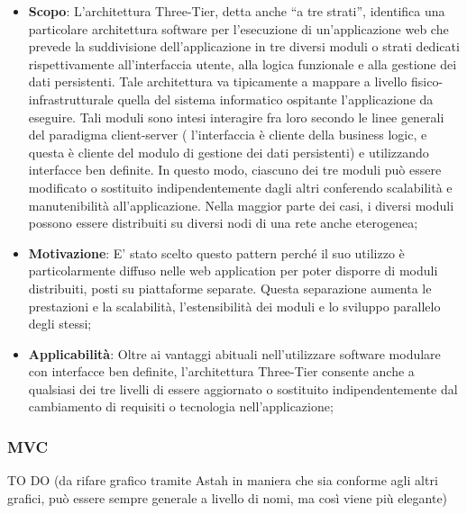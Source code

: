 		\begin{itemize}
			\item \textbf{Scopo}: L'architettura Three-Tier, detta anche ``a tre strati'', identifica una particolare architettura software per l'esecuzione di un'applicazione web che prevede la suddivisione dell'applicazione in tre diversi moduli o strati dedicati rispettivamente all'interfaccia utente, alla logica funzionale e alla gestione dei dati persistenti. Tale architettura va tipicamente a mappare a livello fisico-infrastrutturale quella del sistema informatico ospitante l'applicazione da eseguire.
Tali moduli sono intesi interagire fra loro secondo le linee generali del paradigma client-server ( l'interfaccia è cliente della business logic, e questa è cliente del modulo di gestione dei dati persistenti) e utilizzando interfacce ben definite. In questo modo, ciascuno dei tre moduli può essere modificato o sostituito indipendentemente dagli altri conferendo scalabilità e manutenibilità all'applicazione. Nella maggior parte dei casi, i diversi moduli possono essere distribuiti su diversi nodi di una rete anche eterogenea;

			\item \textbf{Motivazione}: E' stato scelto questo pattern perché il suo utilizzo è particolarmente diffuso nelle web application per poter disporre di moduli distribuiti, posti su piattaforme separate. Questa separazione aumenta le prestazioni e la scalabilità, l'estensibilità dei moduli e lo sviluppo parallelo degli stessi;

			\item \textbf{Applicabilità}: Oltre ai vantaggi abituali nell'utilizzare software modulare con interfacce ben definite, l'architettura Three-Tier consente anche a qualsiasi dei tre livelli di essere aggiornato o sostituito indipendentemente dal cambiamento di requisiti o tecnologia nell'applicazione;

		\end{itemize}


		\newpage
		\subsubsection{MVC} %
		TO DO (da rifare grafico tramite Astah in maniera che sia conforme agli altri grafici, può essere sempre generale a livello di nomi, ma così viene più elegante)

